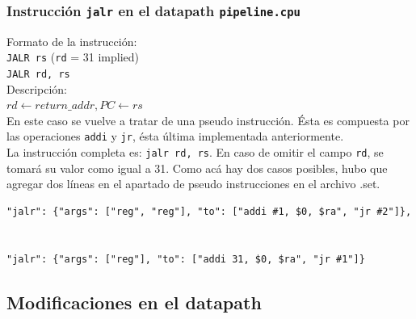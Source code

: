 \documentclass[a4paper,10pt]{article}
\begin{document}
\subsubsection{Instrucción \texttt{jalr} en el datapath \texttt{pipeline.cpu}}
Formato de la instrucci\'on:\\
\texttt{JALR rs} (\texttt{rd} = 31 implied)\\
\texttt{JALR rd, rs}\\
Descripci\'on:\\
$rd \leftarrow return\_addr, PC \leftarrow rs$\\
En este caso se vuelve a tratar de una pseudo instrucción. Ésta es compuesta por las operaciones \texttt{addi} y \texttt{jr}, ésta última implementada anteriormente.\\
La instrucci\'on completa es: \texttt{jalr rd, rs}. En caso de omitir el campo \texttt{rd}, se tomar\'a su valor como igual a 31. Como ac\'a hay dos casos posibles, hubo que agregar dos l\'ineas en el apartado de pseudo instrucciones en el archivo .set. 
\begin{lstlisting}[breaklines=true]
"jalr": {"args": ["reg", "reg"], "to": ["addi #1, $0, $ra", "jr #2"]},


"jalr": {"args": ["reg"], "to": ["addi 31, $0, $ra", "jr #1"]}
\end{lstlisting}




\subsection{Modificaciones en el datapath}
\end{document}
